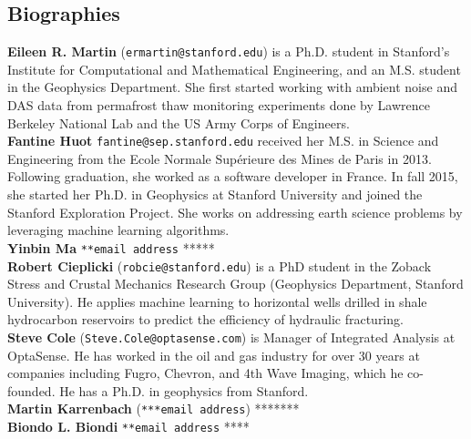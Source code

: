 \documentclass[11pt]{article}
\begin{document}
\subsection*{Biographies}
\vspace{-0.2cm}
\textbf{Eileen R. Martin} (\texttt{ermartin@stanford.edu}) is a Ph.D. student in Stanford's Institute for Computational and Mathematical Engineering, and an M.S. student in the Geophysics Department. She first started working with ambient noise and DAS data from permafrost thaw monitoring experiments done by Lawrence Berkeley National Lab and the US Army Corps of Engineers.
\\
\textbf{Fantine Huot} \texttt{fantine@sep.stanford.edu} received her M.S. in Science and Engineering from the Ecole Normale Sup\'erieure des Mines de Paris in 2013. Following graduation, she worked as a software developer in France. In fall 2015, she started her Ph.D. in Geophysics at Stanford University and joined the Stanford Exploration Project. She works on addressing earth science problems by leveraging machine learning algorithms.
\\
\textbf{Yinbin Ma} \texttt{**email address} *****
\\
\textbf{Robert Cieplicki} (\texttt{robcie@stanford.edu}) is a PhD student in the Zoback Stress and Crustal Mechanics Research Group (Geophysics Department, Stanford University). He applies machine learning to horizontal wells drilled in shale hydrocarbon reservoirs to predict the efficiency of hydraulic fracturing.
\\
\textbf{Steve Cole} (\texttt{Steve.Cole@optasense.com}) is Manager of Integrated Analysis at OptaSense. He has worked in the oil and gas industry for over 30 years at companies including Fugro, Chevron, and 4th Wave Imaging, which he co-founded. He has a Ph.D. in geophysics from Stanford.
\\
\textbf{Martin Karrenbach} (\texttt{***email address}) *******
\\
\textbf{Biondo L. Biondi} \texttt{**email address} ****
\end{document}
